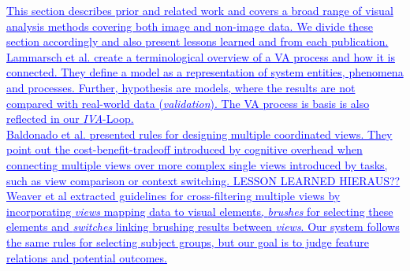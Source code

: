 \documentclass[journal]{style/vgtc} 			          %
\newcommand{\add}[1]{\textcolor{blue}{\uline{#1}}}
\begin{document}

\add{%
%
This section describes prior and related work and covers a broad range of visual analysis methods covering both image and non-image data.
%
We divide these section accordingly and also present lessons learned and from each publication.\\
Lammarsch et al. \cite{Lammarsch2011} create a terminological overview of a VA process and how it is connected.
%
They define a model as a representation of system entities, phenomena and processes.
%
Further, hypothesis are models, where the results are not compared with real-world data (\emph{validation}).
%
The VA process is basis is also reflected in our \emph{IVA}-Loop.\\
Baldonado et al. \cite{Baldonado2000} presented rules for designing multiple coordinated views.
%
They point out the cost-benefit-tradeoff introduced by cognitive overhead when connecting multiple views over more complex single views introduced by tasks, such as view comparison or context switching.
%
LESSON LEARNED HIERAUS??
%
Weaver et al extracted guidelines for cross-filtering multiple views by incorporating \emph{views} mapping data to visual elements, \emph{brushes} for selecting these elements and \emph{switches} linking brushing results between \emph{views}.
%
Our system follows the same rules for selecting subject groups, but our goal is to judge feature relations and potential outcomes.
}
\end{document}
